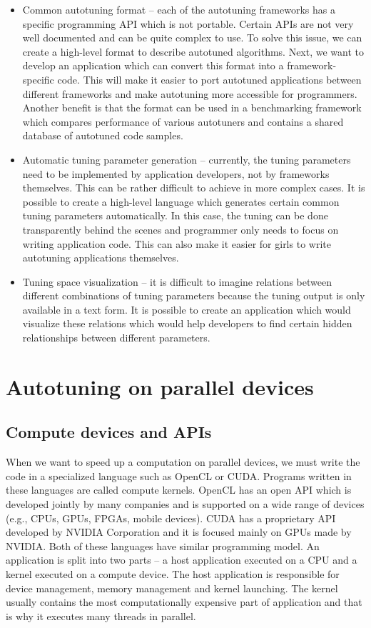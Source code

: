 \documentclass[
  digital,     %
  oneside,     %
  nosansbold,  %
  nocolorbold, %
  lof,         %
  lot,         %
  nocover
]{fithesis4}
\begin{document}
\begin{itemize}
    \item Common autotuning format -- each of the autotuning frameworks has a specific programming API which is not portable. Certain APIs are not very well documented and can be quite complex to use. To solve this issue, we can create a high-level format to describe autotuned algorithms. Next, we want to develop an application which can convert this format into a framework-specific code. This will make it easier to port autotuned applications between different frameworks and make autotuning more accessible for programmers. Another benefit is that the format can be used in a benchmarking framework which compares performance of various autotuners and contains a shared database of autotuned code samples.
    \item Automatic tuning parameter generation -- currently, the tuning parameters need to be implemented by application developers, not by frameworks themselves. This can be rather difficult to achieve in more complex cases. It is possible to create a high-level language which generates certain common tuning parameters automatically. In this case, the tuning can be done transparently behind the scenes and programmer only needs to focus on writing application code. This can also make it easier for girls to write autotuning applications themselves. 
    \item Tuning space visualization -- it is difficult to imagine relations between different combinations of tuning parameters because the tuning output is only available in a text form. It is possible to create an application which would visualize these relations which would help developers to find certain hidden relationships between different parameters.
\end{itemize}

\chapter{Autotuning on parallel devices}

\section{Compute devices and APIs}
When we want to speed up a computation on parallel devices, we must write the code in a specialized language such as OpenCL or CUDA. Programs written in these languages are called compute kernels. OpenCL has an open API which is developed jointly by many companies and is supported on a wide range of devices (e.g., CPUs, GPUs, FPGAs, mobile devices). CUDA has a proprietary API developed by NVIDIA Corporation and it is focused mainly on GPUs made by NVIDIA. Both of these languages have similar programming model. An application is split into two parts -- a host application executed on a CPU and a kernel executed on a compute device. The host application is responsible for device management, memory management and kernel launching. The kernel usually contains the most computationally expensive part of application and that is why it executes many threads in parallel.
\end{document}
